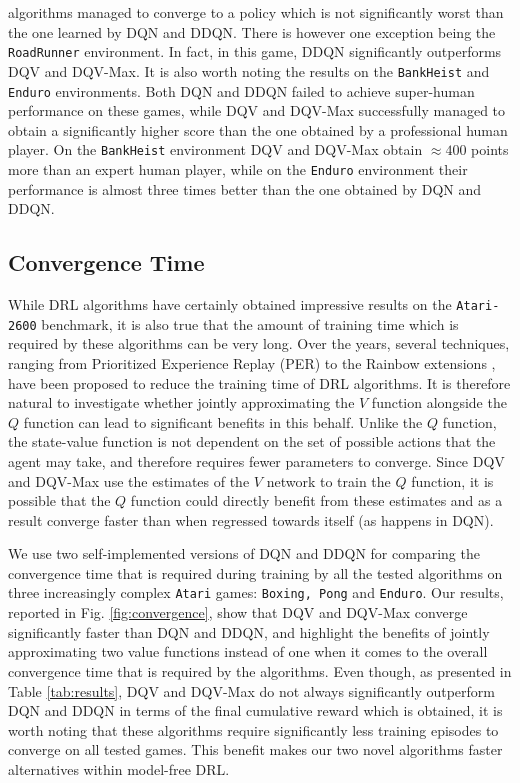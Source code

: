 algorithms managed to converge to a policy which is not significantly worst than the one learned by DQN and DDQN.
There is however one exception being the \texttt{RoadRunner} environment. In fact, in this game, DDQN significantly outperforms DQV and DQV-Max. It is also worth noting the results on the \texttt{BankHeist} and \texttt{Enduro} environments. Both DQN and DDQN failed to achieve super-human performance on these games, while DQV and DQV-Max successfully managed to obtain a significantly higher score than the one obtained by a professional human player. On the \texttt{BankHeist} environment DQV and DQV-Max obtain $\approx 400$ points more than an expert human player, while on the \texttt{Enduro} environment their performance is almost three times better than the one obtained by DQN and DDQN.




\subsection{Convergence Time}
\label{sec:convergence_time}

While DRL algorithms have certainly obtained impressive results on the \texttt{Atari-2600} benchmark, it is also true that the amount of training time which is required by these algorithms can be very long. Over the years, several techniques, ranging from Prioritized Experience Replay (PER) \cite{wang2016dueling} to the Rainbow extensions \cite{hessel2018rainbow}, have been proposed to reduce the training time of DRL algorithms. It is therefore natural to investigate whether jointly approximating the $V$ function alongside the $Q$ function can lead to significant benefits in this behalf. Unlike the $Q$ function, the state-value function is not dependent on the set of possible actions that the agent may take, and therefore requires fewer parameters to converge. Since DQV and DQV-Max use the estimates of the $V$ network to train the $Q$ function, it is possible that the $Q$ function could directly benefit from these estimates and as a result converge faster than when regressed towards itself (as happens in DQN).

We use two self-implemented versions of DQN and DDQN for comparing the convergence time that is required during training by all the tested algorithms on three increasingly complex \texttt{Atari} games: \texttt{Boxing, Pong} and \texttt{Enduro}. Our results, reported in Fig. \ref{fig:convergence}, show that DQV and DQV-Max converge significantly faster than DQN and DDQN, and highlight the benefits of jointly approximating two value functions instead of one when it comes to the overall convergence time that is required by the algorithms. Even though, as presented in Table \ref{tab:results}, DQV and DQV-Max do not always significantly outperform DQN and DDQN in terms of the final cumulative reward which is obtained, it is worth noting that these algorithms require significantly less training episodes to converge on all tested games. This benefit makes our two novel algorithms faster alternatives within model-free DRL.

